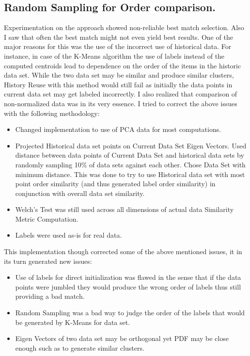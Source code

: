 \subsection{Random Sampling for Order comparison.}
Experimentation on the approach showed non-reliable best match selection. Also I saw that often the best match might not even yield best results. One of the major reasons for this was the use of the incorrect use of historical data. For instance, in case of the K-Means algorithm the use of labels instead of the computed centroids lead to dependence on the order of the items in the historic data set. While the two data set may be similar and produce similar clusters, History Reuse with this method would still fail as initially the data points in current data set may get labeled incorrectly. I also realized that comparison of non-normalized data was in its very essence. I tried to correct the above issues with the following methodology:
\begin{itemize}
    \item Changed implementation to use of PCA data for most computations.
    \item Projected Historical data set points on Current Data Set Eigen Vectors. Used distance between data points of Current Data Set and historical data sets by randomly sampling 10\% of data sets against each other. Chose Data Set with minimum distance. This was done to try to use Historical data set with most point order similarity (and thus generated label order similarity) in conjunction with overall data set similarity.
    \item Welch’s Test was still used across all dimensions of actual data Similarity Metric Computation.
    \item Labels were used as-is for real data.
\end{itemize}
This implementation though corrected some of the above mentioned issues, it in its turn generated new issues:
\begin{itemize}
    \item Use of labels for direct initialization was flawed in the sense that if the data points were jumbled they would produce the wrong order of labels thus still providing a bad match.
    \item Random Sampling was a bad way to judge the order of the labels that would be generated by K-Means for data set.
    \item Eigen Vectors of two data set may be orthogonal yet PDF may be close enough such as to generate similar clusters.
\end{itemize}
